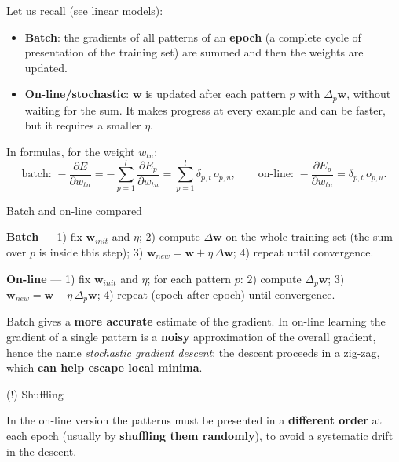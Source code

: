Let us recall (see linear models):

\begin{itemize}
\tightlist
\item
  \textbf{Batch}: the gradients of all patterns of an \textbf{epoch}
  (a complete cycle of presentation of the training set) are summed
  and then the weights are updated.
\item
  \textbf{On-line/stochastic}: \(\mathbf{w}\) is updated after each
  pattern \(p\) with \(\Delta_p\mathbf{w}\), without waiting for the
  sum. It makes progress at every example and can be faster, but it
  requires a smaller \(\eta\).
\end{itemize}

In formulas, for the weight \(w_{tu}\): \[
\text{batch: } -\frac{\partial E}{\partial w_{tu}} = -\sum_{p=1}^{l}\frac{\partial E_p}{\partial w_{tu}} = \sum_{p=1}^{l}\delta_{p,t}\,o_{p,u}, \qquad \text{on-line: } -\frac{\partial E_p}{\partial w_{tu}} = \delta_{p,t}\,o_{p,u}.
\]

\begin{boxabstract}{Batch and on-line compared}

\textbf{Batch} --- 1) fix \(\mathbf{w}_{init}\) and \(\eta\); 2)
compute \(\Delta\mathbf{w}\) on the whole training set (the sum over
\(p\) is inside this step); 3)
\(\mathbf{w}_{new} = \mathbf{w} + \eta\,\Delta\mathbf{w}\); 4) repeat
until convergence.

\textbf{On-line} --- 1) fix \(\mathbf{w}_{init}\) and \(\eta\); for
each pattern \(p\): 2) compute \(\Delta_p\mathbf{w}\); 3)
\(\mathbf{w}_{new} = \mathbf{w} + \eta\,\Delta_p\mathbf{w}\); 4) repeat
(epoch after epoch) until convergence.

\end{boxabstract}

Batch gives a \textbf{more accurate} estimate of the gradient. In
on-line learning the gradient of a single pattern is a \textbf{noisy}
approximation of the overall gradient, hence the name \emph{stochastic
gradient descent}: the descent proceeds in a zig-zag, which \textbf{can
help escape local minima}.

\begin{boxtip}{(!) Shuffling}

In the on-line version the patterns must be presented in a
\textbf{different order} at each epoch (usually by \textbf{shuffling
them randomly}), to avoid a systematic drift in the descent.

\end{boxtip}

